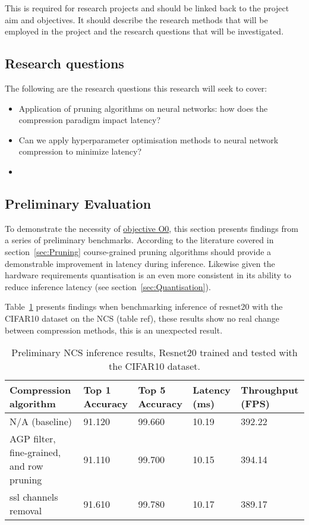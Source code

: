 \documentclass[../D1.tex]{subfiles}
\begin{document}
This is required for research projects and should be linked
back to the project aim and objectives. It should describe the research methods that
will be employed in the project and the research questions that will be investigated.

\subsection{Research questions}
The following are the research questions this research will seek to cover:

\begin{itemize}
    \item Application of pruning algorithms on neural networks: how does the compression paradigm impact latency?
    \item Can we apply hyperparameter optimisation methods to neural network compression to minimize latency?
    \item 
\end{itemize}


\subsection{Preliminary Evaluation}\label{sec:prelimEval}
To demonstrate the necessity of \hyperref[obj:VerifyComp]{objective O0}, this section presents findings from a series of preliminary benchmarks. 
According to the literature covered in section~\ref{sec:Pruning} course-grained pruning algorithms should provide a demonstrable improvement in latency during inference.
Likewise given the hardware requirements quantisation is an even more consistent in its ability to reduce inference latency (see section~\ref{sec:Quantisation}).

Table~\ref{tab:PrelimResults} presents findings when benchmarking inference of resnet20 with the CIFAR10 dataset on the NCS (table ref), these results show no real change between compression methods, this is an unexpected result.

\begin{table}[H]
    \begin{tabular}{@{}|p{5cm}|p{2cm}|p{2cm}|p{2cm}|p{2cm}|@{}}
    \toprule
    Compression algorithm                     & Top 1 Accuracy & Top 5 Accuracy & Latency (ms) & Throughput (FPS) \\ \midrule
    N/A (baseline)                            & 91.120         & 99.660         & 10.19        & 392.22           \\ \midrule
    AGP filter, fine-grained, and row pruning & 91.110         & 99.700         & 10.15        & 394.14           \\ 
    \midrule
    ssl channels removal                      & 91.610         & 99.780         & 10.17        & 389.17           \\
    \bottomrule
    \end{tabular}
    \caption{Preliminary NCS inference results, Resnet20 trained and tested with the CIFAR10 dataset.}
    \label{tab:PrelimResults}
\end{table}
\end{document}
